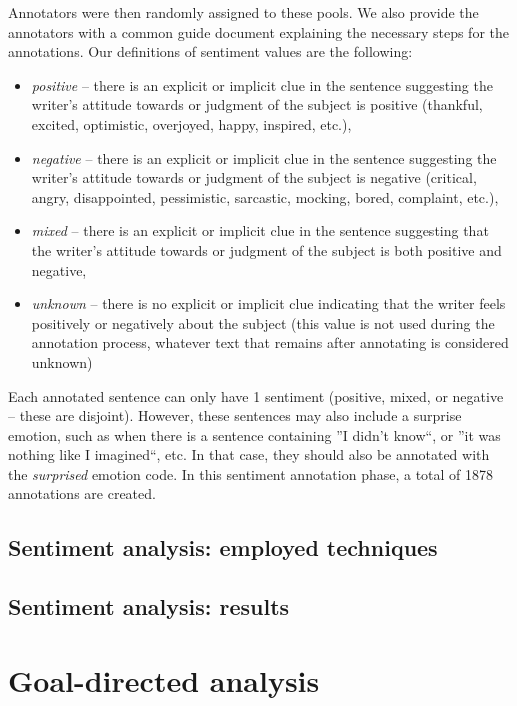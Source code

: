 \documentclass{kerauth}
\begin{document}
Annotators were then randomly assigned to these pools. We also provide the annotators with a common guide document explaining the necessary steps for the annotations. Our definitions of sentiment values are the following:

\begin{itemize}
    \item \textit{positive} -- there is an explicit or implicit clue in the sentence suggesting the writer’s attitude towards or judgment of the subject is positive (thankful, excited, optimistic, overjoyed, happy, inspired, etc.),
    \item \textit{negative} -- there is an explicit or implicit clue in the sentence suggesting the writer's attitude towards or judgment of the subject is negative (critical, angry, disappointed, pessimistic, sarcastic, mocking, bored, complaint, etc.),
    \item \textit{mixed} -- there is an explicit or implicit clue in the sentence suggesting that the writer's attitude towards or judgment of the subject is both positive and negative,
    \item \textit{unknown} -- there is no explicit or implicit clue indicating that the writer feels positively or negatively about the subject (this value is not used during the annotation process, whatever text that remains after annotating is considered unknown)
\end{itemize}

Each annotated sentence can only have 1 sentiment (positive, mixed, or negative -- these are disjoint). However, these sentences may also include a surprise emotion, such as when there is a sentence containing ''I didn’t know``, or ''it was nothing like I imagined``, etc. In that case, they should also be annotated with the \textit{surprised} emotion code. In this sentiment annotation phase, a total of 1878 annotations are created.

\subsection{Sentiment analysis: employed techniques}
\subsection{Sentiment analysis: results}

\section{Goal-directed analysis}
\label{s:goal}
\end{document}
